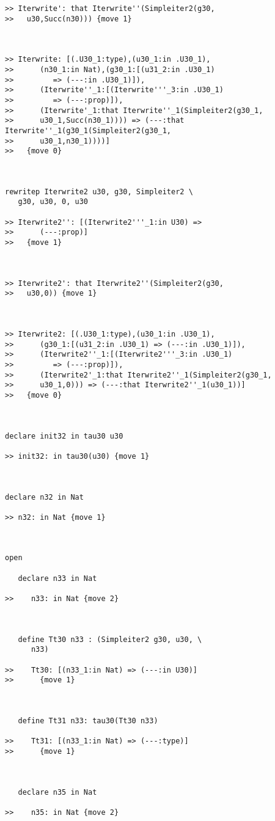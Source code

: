 \documentclass[12pt]{article}
\begin{document}
\begin{verbatim}
>> Iterwrite': that Iterwrite''(Simpleiter2(g30,
>>   u30,Succ(n30))) {move 1}



>> Iterwrite: [(.U30_1:type),(u30_1:in .U30_1),
>>      (n30_1:in Nat),(g30_1:[(u31_2:in .U30_1)
>>         => (---:in .U30_1)]),
>>      (Iterwrite''_1:[(Iterwrite'''_3:in .U30_1)
>>         => (---:prop)]),
>>      (Iterwrite'_1:that Iterwrite''_1(Simpleiter2(g30_1,
>>      u30_1,Succ(n30_1)))) => (---:that Iterwrite''_1(g30_1(Simpleiter2(g30_1,
>>      u30_1,n30_1))))]
>>   {move 0}



rewritep Iterwrite2 u30, g30, Simpleiter2 \
   g30, u30, 0, u30

>> Iterwrite2'': [(Iterwrite2'''_1:in U30) =>
>>      (---:prop)]
>>   {move 1}



>> Iterwrite2': that Iterwrite2''(Simpleiter2(g30,
>>   u30,0)) {move 1}



>> Iterwrite2: [(.U30_1:type),(u30_1:in .U30_1),
>>      (g30_1:[(u31_2:in .U30_1) => (---:in .U30_1)]),
>>      (Iterwrite2''_1:[(Iterwrite2'''_3:in .U30_1)
>>         => (---:prop)]),
>>      (Iterwrite2'_1:that Iterwrite2''_1(Simpleiter2(g30_1,
>>      u30_1,0))) => (---:that Iterwrite2''_1(u30_1))]
>>   {move 0}



declare init32 in tau30 u30

>> init32: in tau30(u30) {move 1}



declare n32 in Nat

>> n32: in Nat {move 1}



open

   declare n33 in Nat

>>    n33: in Nat {move 2}



   define Tt30 n33 : (Simpleiter2 g30, u30, \
      n33)

>>    Tt30: [(n33_1:in Nat) => (---:in U30)]
>>      {move 1}



   define Tt31 n33: tau30(Tt30 n33)

>>    Tt31: [(n33_1:in Nat) => (---:type)]
>>      {move 1}



   declare n35 in Nat

>>    n35: in Nat {move 2}




\end{verbatim}
\end{document}
